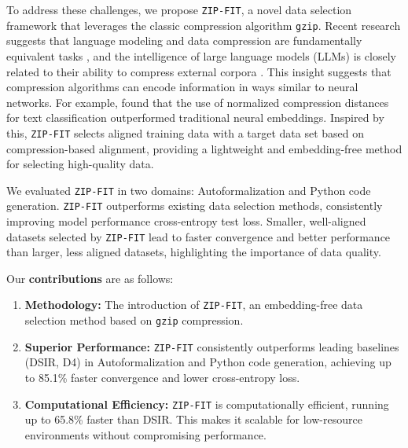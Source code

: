 To address these challenges, we propose \texttt{ZIP-FIT}, a novel data selection framework that leverages the classic compression algorithm \texttt{gzip}.
Recent research suggests that language modeling and data compression are fundamentally equivalent tasks \citep{languagemodelingcompression}, and the intelligence of large language models (LLMs) is closely related to their ability to compress external corpora \citep{compressionrepresentsintelligencelinearly}. 
This insight suggests that compression algorithms can encode information in ways similar to neural networks. 
For example, \citet{jiang-etal-2023-low} found that the use of normalized compression distances for text classification outperformed traditional neural embeddings. 
Inspired by this, \texttt{ZIP-FIT} selects aligned training data with a target data set based on compression-based alignment, providing a lightweight and embedding-free method for selecting high-quality data.

We evaluated \texttt{ZIP-FIT} in two domains: Autoformalization and Python code generation. 
\texttt{ZIP-FIT} outperforms existing data selection methods, consistently improving model performance cross-entropy test loss. 
Smaller, well-aligned datasets selected by \texttt{ZIP-FIT} lead to faster convergence and better performance than larger, less aligned datasets, highlighting the importance of data quality.

Our \textbf{contributions} are as follows:
\begin{enumerate}
    \item \textbf{Methodology:} The introduction of \texttt{ZIP-FIT}, an embedding-free data selection method based on \texttt{gzip} compression.
    \item \textbf{Superior Performance:} \texttt{ZIP-FIT} consistently outperforms leading baselines (DSIR, D4) in Autoformalization and Python code generation, achieving up to 85.1\% faster convergence and lower cross-entropy loss.
    \item \textbf{Computational Efficiency:} \texttt{ZIP-FIT} is computationally efficient, running up to 65.8\% faster than DSIR. This makes it scalable for low-resource environments without compromising performance.
\end{enumerate}

